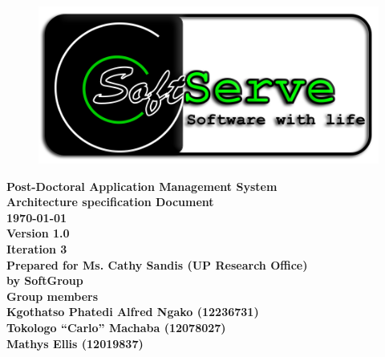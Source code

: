 \documentclass[12pt]{article}
\newcommand{\Title}{Architecture specification Document} %
\newcommand{\ssr}{Soft\color{green}{Serve }\color{black}}
\newcommand{\version}{1.0}
\newcommand{\iteration}{3}
\newcommand{\client}{Ms. Cathy Sandis (UP Research Office)}
\newcommand{\project}{Post-Doctoral Application Management System}
\begin{document}
\vspace{4em}

\begin{center}%

\begin{figure}[ht!]
\centering
\includegraphics{../Images_Docs/logo.png}
\end{figure}
\LARGE \bf \project \\[1em]
\LARGE \bf \Title \\[0.25em]
\large \bf \today\\
\bf Version \version\\
\bf Iteration \iteration\\[0.5em]
\Large \bf Prepared for \client\\
\Large \bf by
\Large {\bf \ssr Group }\\[0.5em]
\LARGE {\bf Group members}\\[0.25em]
\large
Kgothatso Phatedi Alfred Ngako (12236731) \\[0.5em]
Tokologo “Carlo” Machaba (12078027) \\[0.5em]
Mathys Ellis (12019837) \\[8em]

\end{center}%

\end{document}
